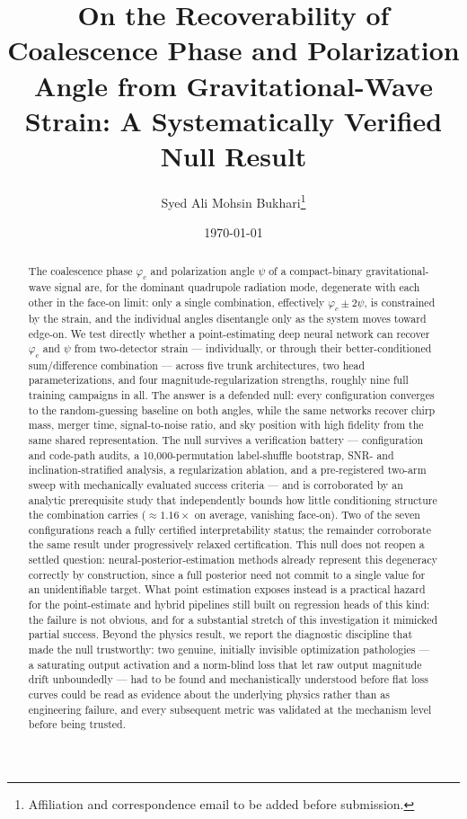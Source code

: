 \documentclass[11pt]{article}
\title{On the Recoverability of Coalescence Phase and Polarization Angle from Gravitational-Wave Strain: A Systematically Verified Null Result}
\author{Syed Ali Mohsin Bukhari\thanks{Affiliation and correspondence email to be added before submission.}}
\date{\today}
\begin{document}
\maketitle

\begin{abstract}
The coalescence phase $\varphi_c$ and polarization angle $\psi$ of a compact-binary gravitational-wave signal are, for the dominant quadrupole radiation mode, degenerate with each other in the face-on limit: only a single combination, effectively $\varphi_c \pm 2\psi$, is constrained by the strain, and the individual angles disentangle only as the system moves toward edge-on. We test directly whether a point-estimating deep neural network can recover $\varphi_c$ and $\psi$ from two-detector strain --- individually, or through their better-conditioned sum/difference combination --- across five trunk architectures, two head parameterizations, and four magnitude-regularization strengths, roughly nine full training campaigns in all. The answer is a defended null: every configuration converges to the random-guessing baseline on both angles, while the same networks recover chirp mass, merger time, signal-to-noise ratio, and sky position with high fidelity from the same shared representation. The null survives a verification battery --- configuration and code-path audits, a 10{,}000-permutation label-shuffle bootstrap, SNR- and inclination-stratified analysis, a regularization ablation, and a pre-registered two-arm sweep with mechanically evaluated success criteria --- and is corroborated by an analytic prerequisite study that independently bounds how little conditioning structure the combination carries ($\approx 1.16\times$ on average, vanishing face-on). Two of the seven configurations reach a fully certified interpretability status; the remainder corroborate the same result under progressively relaxed certification. This null does not reopen a settled question: neural-posterior-estimation methods already represent this degeneracy correctly by construction, since a full posterior need not commit to a single value for an unidentifiable target. What point estimation exposes instead is a practical hazard for the point-estimate and hybrid pipelines still built on regression heads of this kind: the failure is not obvious, and for a substantial stretch of this investigation it mimicked partial success. Beyond the physics result, we report the diagnostic discipline that made the null trustworthy: two genuine, initially invisible optimization pathologies --- a saturating output activation and a norm-blind loss that let raw output magnitude drift unboundedly --- had to be found and mechanistically understood before flat loss curves could be read as evidence about the underlying physics rather than as engineering failure, and every subsequent metric was validated at the mechanism level before being trusted.
\end{abstract}
\end{document}
